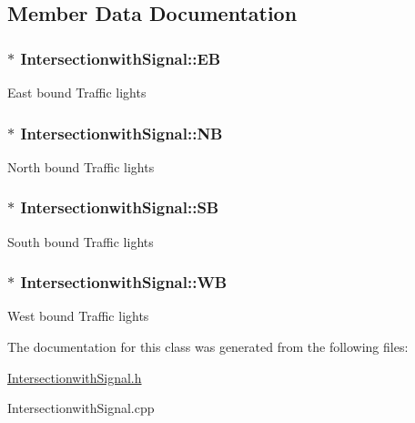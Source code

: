 \subsection{Member Data Documentation}
\hypertarget{class_intersectionwith_signal_a8a57308329169b7c05acdeabfaa74206}{
\subsubsection[{E\-B}]{$\ast$ Intersectionwith\-Signal\-::\-E\-B}}\label{class_intersectionwith_signal_a8a57308329169b7c05acdeabfaa74206}
East bound Traffic lights \hypertarget{class_intersectionwith_signal_af548458cb3fbe82d25a13fd9295406f7}{
\subsubsection[{N\-B}]{$\ast$ Intersectionwith\-Signal\-::\-N\-B}}\label{class_intersectionwith_signal_af548458cb3fbe82d25a13fd9295406f7}
North bound Traffic lights \hypertarget{class_intersectionwith_signal_a19a6f5316f7d0ec4c08e6f80126b3e6c}{
\subsubsection[{S\-B}]{$\ast$ Intersectionwith\-Signal\-::\-S\-B}}\label{class_intersectionwith_signal_a19a6f5316f7d0ec4c08e6f80126b3e6c}
South bound Traffic lights \hypertarget{class_intersectionwith_signal_a5f321e72c10bb5a4ebeb6d314135fdbb}{
\subsubsection[{W\-B}]{$\ast$ Intersectionwith\-Signal\-::\-W\-B}}\label{class_intersectionwith_signal_a5f321e72c10bb5a4ebeb6d314135fdbb}
West bound Traffic lights 

The documentation for this class was generated from the following files\-:\begin{DoxyCompactItemize}
\item 
\hyperlink{_intersectionwith_signal_8h}{Intersectionwith\-Signal.\-h}\item 
Intersectionwith\-Signal.\-cpp\end{DoxyCompactItemize}
